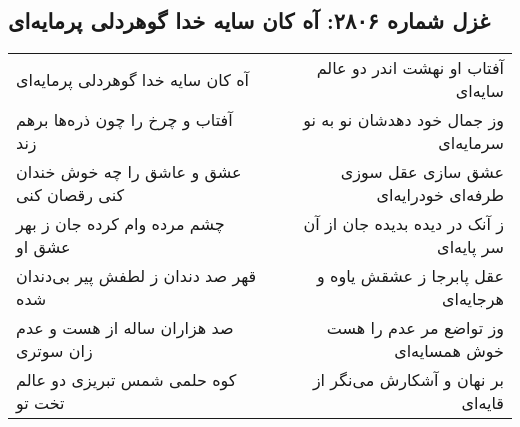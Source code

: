 \begin{center}
\section*{غزل شماره ۲۸۰۶: آه کان سایه خدا گوهردلی پرمایه‌ای}
\label{sec:2806}
\begin{longtable}{l p{0.5cm} r}
آه کان سایه خدا گوهردلی پرمایه‌ای
&&
آفتاب او نهشت اندر دو عالم سایه‌ای
\\
آفتاب و چرخ را چون ذره‌ها برهم زند
&&
وز جمال خود دهدشان نو به نو سرمایه‌ای
\\
عشق و عاشق را چه خوش خندان کنی رقصان کنی
&&
عشق سازی عقل سوزی طرفه‌ای خودرایه‌ای
\\
چشم مرده وام کرده جان ز بهر عشق او
&&
ز آنک در دیده بدیده جان از آن سر پایه‌ای
\\
قهر صد دندان ز لطفش پیر بی‌دندان شده
&&
عقل پابرجا ز عشقش یاوه و هرجایه‌ای
\\
صد هزاران ساله از هست و عدم زان سوتری
&&
وز تواضع مر عدم را هست خوش همسایه‌ای
\\
کوه حلمی شمس تبریزی دو عالم تخت تو
&&
بر نهان و آشکارش می‌نگر از قایه‌ای
\\
\end{longtable}
\end{center}
